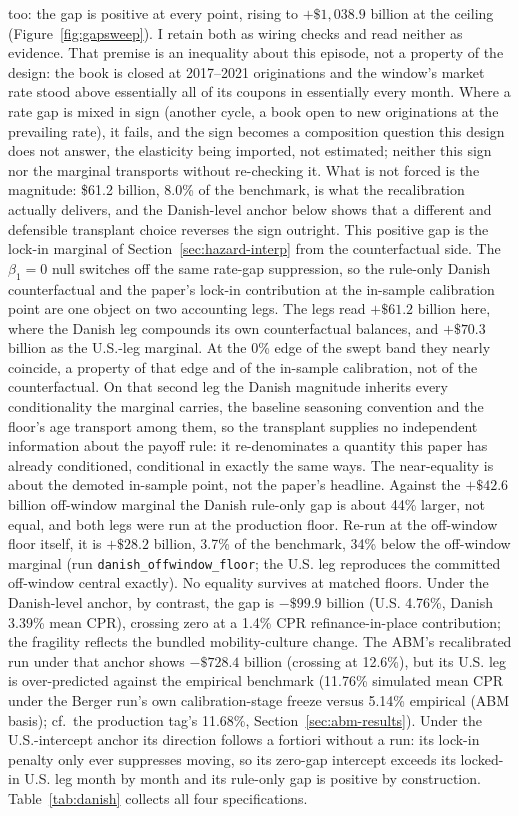 \documentclass[12pt]{article}
\begin{document}
too: the gap is positive at every point, rising to $+\$1{,}038.9$ billion at the ceiling (Figure~\ref{fig:gapsweep}). I retain both as wiring checks and read neither as evidence. That premise is an inequality about this episode, not a property of the design: the book is closed at 2017--2021 originations and the window's market rate stood above essentially all of its coupons in essentially every month. Where a rate gap is mixed in sign (another cycle, a book open to new originations at the prevailing rate), it fails, and the sign becomes a composition question this design does not answer, the elasticity being imported, not estimated; neither this sign nor the marginal transports without re-checking it. What is not forced is the magnitude: \$61.2 billion, 8.0\% of the benchmark, is what the recalibration actually delivers, and the Danish-level anchor below shows that a different and defensible transplant choice reverses the sign outright. This positive gap is the lock-in marginal of Section~\ref{sec:hazard-interp} from the counterfactual side. The $\beta_1 = 0$ null switches off the same rate-gap suppression, so the rule-only Danish counterfactual and the paper's lock-in contribution at the in-sample calibration point are one object on two accounting legs. The legs read $+\$61.2$ billion here, where the Danish leg compounds its own counterfactual balances, and $+\$70.3$ billion as the U.S.-leg marginal. At the 0\% edge of the swept band they nearly coincide, a property of that edge and of the in-sample calibration, not of the counterfactual. On that second leg the Danish magnitude inherits every conditionality the marginal carries, the baseline seasoning convention and the floor's age transport among them, so the transplant supplies no independent information about the payoff rule: it re-denominates a quantity this paper has already conditioned, conditional in exactly the same ways. The near-equality is about the demoted in-sample point, not the paper's headline. Against the $+\$42.6$ billion off-window marginal the Danish rule-only gap is about 44\% larger, not equal, and both legs were run at the production floor. Re-run at the off-window floor itself, it is $+\$28.2$ billion, 3.7\% of the benchmark, 34\% below the off-window marginal (run \texttt{danish\_offwindow\_floor}; the U.S. leg reproduces the committed off-window central exactly). No equality survives at matched floors. Under the Danish-level anchor, by contrast, the gap is $-\$99.9$ billion (U.S. 4.76\%, Danish 3.39\% mean CPR), crossing zero at a 1.4\% CPR refinance-in-place contribution; the fragility reflects the bundled mobility-culture change. The ABM's recalibrated run under that anchor shows $-\$728.4$ billion (crossing at 12.6\%), but its U.S. leg is over-predicted against the empirical benchmark (11.76\% simulated mean CPR under the Berger run's own calibration-stage freeze versus 5.14\% empirical (ABM basis); cf.\ the production tag's 11.68\%, Section~\ref{sec:abm-results}). Under the U.S.-intercept anchor its direction follows a fortiori without a run: its lock-in penalty only ever suppresses moving, so its zero-gap intercept exceeds its locked-in U.S. leg month by month and its rule-only gap is positive by construction. Table~\ref{tab:danish} collects all four specifications.
\end{document}
